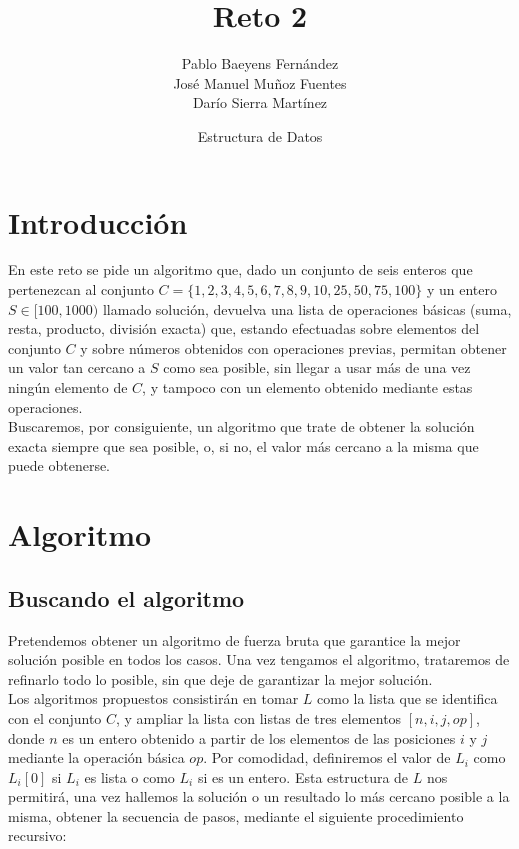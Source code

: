 \documentclass{article}
\title{Reto 2}
\date{Estructura de Datos}
\author{Pablo Baeyens Fernández\\José Manuel Muñoz Fuentes\\Darío Sierra Martínez}
\begin{document}
\maketitle

\section{Introducción}
En este reto se pide un algoritmo que, dado un conjunto de seis enteros que pertenezcan al conjunto $C = \{1, 2, 3, 4, 5, 6, 7, 8, 9, 10, 25, 50, 75, 100\}$ y un entero $S \in [100, 1000)$ llamado solución, devuelva una lista de operaciones básicas (suma, resta, producto, división exacta) que, estando efectuadas sobre elementos del conjunto $C$ y sobre números obtenidos con operaciones previas, permitan obtener un valor tan cercano a $S$ como sea posible, sin llegar a usar más de una vez ningún elemento de $C$, y tampoco con un elemento obtenido mediante estas operaciones. \\

Buscaremos, por consiguiente, un algoritmo que trate de obtener la solución exacta siempre que sea posible, o, si no, el valor más cercano a la misma que puede obtenerse.

\section{Algoritmo}
\subsection{Buscando el algoritmo}
Pretendemos obtener un algoritmo de fuerza bruta que garantice la mejor solución posible en todos los casos. Una vez tengamos el algoritmo, trataremos de refinarlo todo lo posible, sin que deje de garantizar la mejor solución.\\

Los algoritmos propuestos consistirán en tomar $L$ como la lista que se identifica con el conjunto $C$, y ampliar la lista con listas de tres elementos $[n, i, j, op]$, donde $n$ es un entero obtenido a partir de los elementos de las posiciones $i$ y $j$ mediante la operación básica $op$. Por comodidad, definiremos el valor de $L_i$ como $L_i[0]$ si $L_i$ es lista o como $L_i$ si es un entero. Esta estructura de $L$ nos permitirá, una vez hallemos la solución o un resultado lo más cercano posible a la misma, obtener la secuencia de pasos, mediante el siguiente procedimiento recursivo: \\
\end{document}
